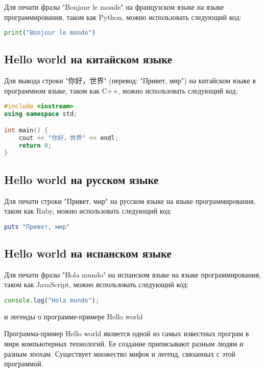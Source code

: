 \documentclass[draft]{article}
\begin{document}
Для печати фразы "Bonjour le monde" на французском языке на языке программирования, таком как Python, можно использовать следующий код:

\begin{lstlisting}[language=Python]
print("Bonjour le monde")
\end{lstlisting}

\subsection{Hello world на китайском языке}

Для вывода строки "你好，世界" (перевод: "Привет, мир") на китайском языке в программном языке, таком как C++, можно использовать следующий код:

\begin{lstlisting}[language=C++]
#include <iostream>
using namespace std;

int main() {
    cout << "你好，世界" << endl;
    return 0;
}
\end{lstlisting}

\subsection{Hello world на русском языке}

Для печати строки "Привет, мир" на русском языке на языке программирования, таком как Ruby, можно использовать следующий код:

\begin{lstlisting}[language=Ruby]
puts "Привет, мир"
\end{lstlisting}

\subsection{Hello world на испанском языке}

Для печати фразы "Hola mundo" на испанском языке на языке программирования, таком как JavaScript, можно использовать следующий код:

\begin{lstlisting}[language=JavaScript]
console.log("Hola mundo");
\end{lstlisting} и легенды о программе-примере Hello world

Программа-пример Hello world является одной из самых известных програм в мире компьютерных технологий. Ее создание приписывают разным людям и разным эпохам. Существует множество мифов и легенд, связанных с этой программой.
\end{document}
